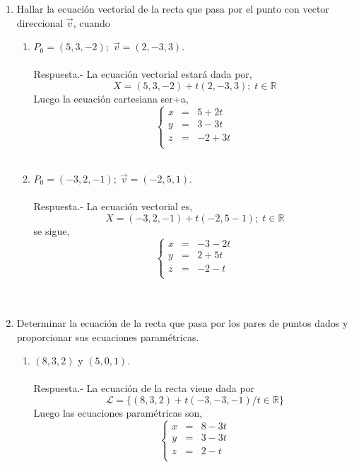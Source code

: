 \begin{enumerate}

    \item Hallar la ecuación vectorial de la recta que pasa por el punto con vector direccional $\vec{v}$, cuando 
	\begin{enumerate}[\bfseries a)]
	    
	    \item $P_0=(5,3,-2); \; \vec{v}=(2,-3,3)$.\\\\
		Respuesta.-\; La ecuación vectorial estará dada por, $$ X = (5,3,-2) + t(2,-3,3) ;\;  t \in \mathbb{R}$$ 
		Luego la ecuación cartesiana ser+a, 
		$$\left\{\begin{array}{rcr}
		    x&=&5+2t\\
		    y&=&3-3t\\
		    z&=&-2+3t\\
		\end{array}\right.$$\\

	    \item $P_0=(-3,2,-1); \; \vec{v}=(-2,5,1)$.\\\\
		Respuesta.-\; La ecuación vectorial es, $$X= (-3,2,-1) + t(-2,5-1) ;\;  t\in \mathbb{R} $$
		se sigue,
		$$\left\{\begin{array}{rcr}
		    x&=&-3-2t\\
		    y&=&2+5t\\
		    z&=&-2-t\\
		\end{array}\right.$$\\\\

	\end{enumerate}

    \item Determinar la ecuación de la recta que pasa por los pares de puntos dados y proporcionar sus ecuaciones paramétricas.

	\begin{enumerate}[\bfseries a)]
	    
	    \item $(8,3,2)$ y $(5,0,1)$.\\\\
		Respuesta.-\; La ecuación de la recta viene dada por 
		$$\mathcal{L} = \lbrace (8,3,2) + t(-3,-3,-1) / t\in \mathbb{R} \rbrace$$
		Luego las ecuaciones paramétricas son, 
		$$\left\{\begin{array}{rcr}
		    x&=&8-3t\\
		    y&=&3-3t\\
		    z&=&2-t\\
		\end{array}\right.$$\\


\end{enumerate}
\end{enumerate}
